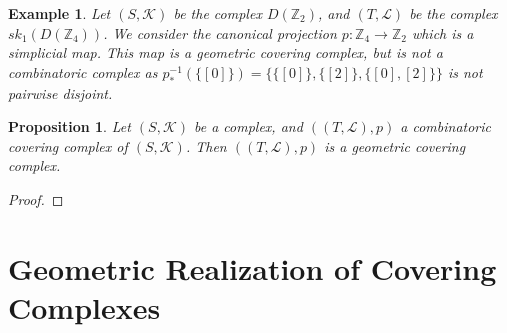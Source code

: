 \documentclass{amsart}
\newtheorem{proposition}{Proposition}[section]
\newtheorem{example}{Example}[section]
\begin{document}
\begin{example}
Let $(S,\mathcal{K})$ be the complex $D(\mathbb{Z}_2)$, and $(T,\mathcal{L})$ be the complex  $sk_1(D(\mathbb{Z}_4))$. We consider the canonical projection $p\colon \mathbb{Z}_4\longrightarrow \mathbb{Z}_2$ which is a simplicial map.  This map is a  geometric covering complex, but is not a combinatoric complex as $p_*^{-1}(\{[0]\})=\{\{[0]\},\{[2]\},\{[0],[2]\}\}$ is not pairwise disjoint.
\end{example}

\begin{proposition}
Let $(S,\mathcal{K})$ be a complex, and $((T,\mathcal{L}),p)$ a combinatoric covering complex of $(S,\mathcal{K})$. Then $((T,\mathcal{L}),p)$ is a geometric covering complex.
\end{proposition}

\begin{proof}

\end{proof}


\section{Geometric Realization of Covering Complexes}
\end{document}
